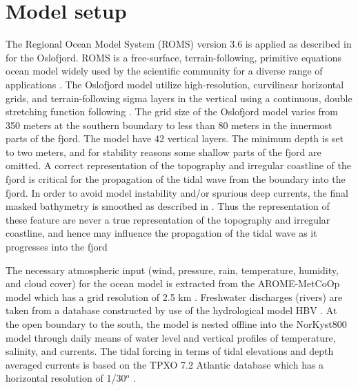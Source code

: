 \section{Model setup}
\label{sec:model_setup}

The Regional Ocean Model System (ROMS) version 3.6 is applied as described in \cite{roed16} for the Oslofjord. ROMS is a free-surface, terrain-following, primitive equations ocean model widely used by the scientific community for a diverse range of applications \cite[]{shchepetkin05,shchepetkin09,haidvogel08}. 
The Oslofjord model utilize high-resolution, curvilinear horizontal grids, and terrain-following sigma layers in the vertical using a continuous, double stretching function following \cite{shchepetkin09}. The grid size of the Oslofjord model varies from 350 meters at the southern boundary to less than 80 meters in the innermost parts of the fjord. The model have 42 vertical layers. The minimum depth is set to two meters, and for stability reasons some shallow parts of the fjord are omitted. A correct representation of the topography and irregular coastline of the fjord is critical for the propagation of the tidal wave from the boundary into the fjord. In order to avoid model instability and/or spurious deep currents, the final masked bathymetry is smoothed as described in \cite{roed16}. Thus the representation of these feature are never a true representation of the topography and irregular coastline, and hence may influence the propagation of the tidal wave as it progresses into the fjord

The necessary atmospheric input (wind, pressure, rain, temperature, humidity, and cloud cover) for the ocean model is extracted from the AROME-MetCoOp model which has a grid resolution of 2.5 km \cite[]{muller2015}. Freshwater discharges (rivers) are taken from a database constructed by use of the hydrological model HBV \cite[]{beldring2003}. At the open boundary to the south, the model is nested offline into the NorKyst800 model \cite[]{albretsen11} through daily means of water level and vertical profiles of temperature, salinity, and currents.  
The tidal forcing in terms of tidal elevations and depth averaged currents is based on the TPXO 7.2 Atlantic database which has a horizontal resolution of 1/30$^o$ \cite[]{egbert02}.

